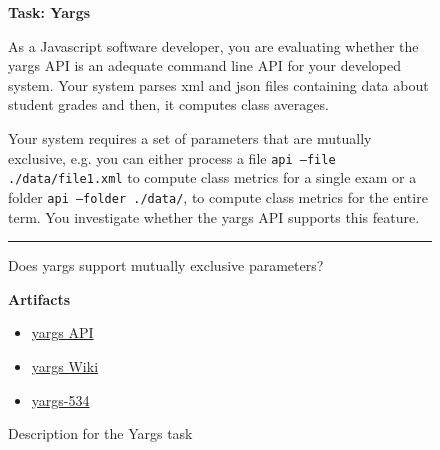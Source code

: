 \begin{figure}[!htb]
\begin{mdframed}[backgroundcolor=gray!04] 
\begin{scriptsize}

{\large \textbf{Task: Yargs}} \bigskip





As a Javascript software developer, you are evaluating whether the   yargs  API is an adequate command
line API for your developed system. Your system parses xml and json files containing data about student
grades and then, it computes class averages. \medskip

Your system requires a set of parameters that are mutually
exclusive, e.g. you can either process a file  \texttt{api --file ./data/file1.xml}   to compute class metrics for a
single exam or a folder \texttt{api --folder ./data/}, to compute class metrics for the entire term. You
investigate whether the yargs API supports this feature.


\begin{center}
\rule{10cm}{0.4pt}
\end{center}

Does yargs support mutually exclusive parameters?

\medskip

\textbf{Artifacts}

\begin{itemize}
    \item \href{https://github.com/yargs/yargs/blob/master/docs/api.md}{yargs API}
    \item \href{https://github.com/yargs/yargs/wiki}{yargs Wiki}
    \item \href{https://github.com/yargs/yargs/issues/534}{yargs-534}
\end{itemize}

\end{scriptsize}
\end{mdframed}
\caption{Description for the Yargs task}
\end{figure}

    
